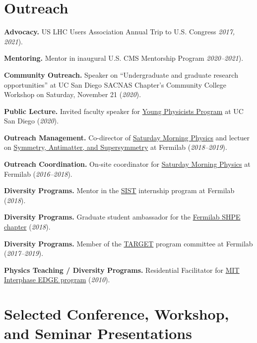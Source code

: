 \documentclass[11pt]{res}
\newcommand{\MarginText}[1]{\section{#1}\vspace{10pt}}
\begin{document}
\begin{resume}

\MarginText{Outreach}

\textbf{Advocacy.} US LHC Users Association Annual Trip to U.S. Congress \textit{2017, 2021}).

\textbf{Mentoring.} Mentor in inaugural U.S. CMS Mentorship Program \textit{2020--2021}).

\textbf{Community Outreach.} Speaker on ``Undergraduate and graduate research opportunities'' at UC San Diego SACNAS Chapter's Community College Workshop on Saturday, November 21 (\textit{2020}).

\textbf{Public Lecture.} Invited faculty speaker for \href{http://ypp.ucsd.edu/}{Young Physicists Program} at UC San Diego (\textit{2020}).

\textbf{Outreach Management.} Co-director of \href{http://saturdaymorningphysics.fnal.gov/}{Saturday
  Morning Physics} and lectuer on \href{http://saturdaymorningphysics.fnal.gov/fall-session-2018/}{Symmetry, Antimatter, and Supersymmetry} at Fermilab (\textit{2018--2019}).

\textbf{Outreach Coordination.} On-site coordinator for \href{http://saturdaymorningphysics.fnal.gov/}{Saturday Morning Physics} at Fermilab (\textit{2016--2018}).

\textbf{Diversity Programs.} Mentor in the \href{http://diversity.fnal.gov/sist/}{SIST} internship program at Fermilab (\textit{2018}).

\textbf{Diversity Programs.} Graduate student ambassador for the \href{http://diversity.fnal.gov/fshpe/}{Fermilab SHPE chapter} (\textit{2018}).

\textbf{Diversity Programs.} Member of the \href{http://diversity.fnal.gov/target/}{TARGET} program committee at Fermilab (\textit{2017--2019}).

\textbf{Physics Teaching / Diversity Programs.} Residential Facilitator for \href{http://ome.mit.edu/programs-services/program-overview}{MIT Interphase EDGE program} (\textit{2010}).


\MarginText{Selected Conference, Workshop, and Seminar Presentations}


\end{resume}
\end{document}
